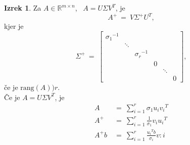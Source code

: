 \documentclass[11pt]{article}
\theoremstyle{definition}
\newtheorem{izrek}{Izrek}
\begin{document}
\begin{izrek}

Za $A \in \mathbb{R}^{m \times n}$, ~$A = U \Sigma V^T$, je
$$A^+ ~=~ V \Sigma^+ U^T,$$
kjer je
$$\Sigma^+ ~=~ \begin{bmatrix}
{\sigma_1}^{-1} & ~ & ~ & ~ & ~ & ~ \\
~ & \ddots & ~ & ~ & ~ & ~ \\
~ & ~ & {\sigma_r}^{-1} & ~ & ~ & ~ \\
~ & ~ & ~ & 0 & ~ & ~ \\
~ & ~ & ~ & ~ & \ddots & \\
~ & ~ & ~ & ~ & ~ & 0
\end{bmatrix},$$
če je $\text{rang}(A) ) r$. \\

\noindent Če je $A = U \Sigma V^T$, je 
\begin{align*}
A ~&=~ \sum_{i=1}^r \sigma_1 u_i {v_i}^T \\ 
A^+ ~&=~ \sum_{i=1}^r \frac{1}{\sigma_1} v_i {u_i}^T \\
A^+ b ~&=~ \sum_{i=1}^r \frac{{u_i}^T b}{\sigma_i} v:i
\end{align*}

\end{izrek}
\vspace{0.5cm}


\pagebreak

\end{document}
